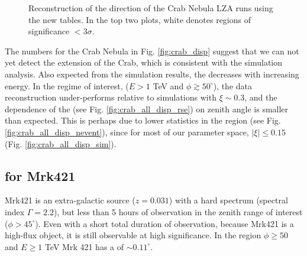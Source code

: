 \documentclass[main.tex]{subfiles}
\begin{document}
\begin{figure}[H]
  \begin{center}
  \end{center}
  \caption[Crab (LZA runs) direction reconstruction using Method5t.]{Reconstruction of the direction of the Crab Nebula LZA runs using the new \disp tables. In the top two plots, white denotes regions of significance $<3\sigma$.}
  \label{fig:crab_all_disp}
\end{figure}

The numbers for the Crab Nebula in Fig. \ref{fig:crab_disp} suggest that we can not yet detect the extension of the Crab, which is consistent with the simulation analysis. Also expected from the simulation results, the \rse decreases with increasing energy. In the regime of interest, ($E>1$ TeV and $\phi\gtrsim 50^\circ$), the data reconstruction under-performs relative to simulations with $\xi\sim 0.3$, and the dependence of the \rse (see Fig. \ref{fig:crab_all_disp_rse}) on zenith angle is smaller than expected. This is perhaps due to lower statistics in the region (see Fig. \ref{fig:crab_all_disp_nevent}), since for most of our parameter space, $|\xi| \leq 0.15$ (Fig. \ref{fig:crab_all_disp_sim}).

\subsection{\rse for Mrk421}
Mrk421 is an extra-galactic source ($z=0.031$) with a hard spectrum (spectral index $\Gamma=2.2$), but less than 5 hours of observation in the zenith range of interest ($\phi>45^\circ$). Even with a short total duration of observation, because Mrk421 is a high-flux object, it is still observable at high significance. In the region $\phi\geq50$ and $E\geq 1$ TeV Mrk 421 has a \rse of $\sim 0.11^\circ$.
\end{document}
